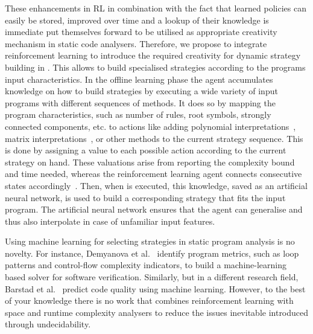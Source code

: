 \documentclass[envcountsame]{llncs}
\begin{document}
These enhancements in RL in combination with the fact that learned policies can easily be stored,
improved over time and a lookup of their knowledge is immediate put themselves forward to be
utilised as appropriate creativity mechanism in static code analysers.
%
Therefore, we propose to integrate reinforcement learning to introduce the required creativity for
dynamic strategy building in \tct{}. This allows to build specialised strategies according to the
programs input characteristics.
%
In the offline learning phase the agent accumulates knowledge on how to build strategies by
executing a wide variety of input programs with different sequences of methods. It does so by
mapping the program characteristics, such as number of rules, root symbols, strongly connected
components, etc\@. to actions like adding polynomial interpretations~\cite{hirokawa2008automated},
matrix interpretations~\cite{moser2008complexity}, or other methods to the current strategy
sequence. This is done by assigning a value to each possible action according to the current
strategy on hand. These valuations arise from reporting the complexity bound and time needed,
whereas the reinforcement learning agent connects consecutive states
accordingly~\cite{sutton1998introduction}.
%
Then, when \tct{} is executed, this knowledge, saved as an artificial neural network, is used to
build a corresponding strategy that fits the input program. The artificial neural network ensures
that the agent can generalise and thus also interpolate in case of unfamiliar input features.

%


Using machine learning for selecting strategies in static program analysis is no novelty. For
instance, Demyanova et al.~\cite{demyanova2017empirical} identify program metrics, such as loop
patterns and control-flow complexity indicators, to build a machine-learning based solver for
software verification. Similarly, but in a different research field, Barstad et
al.~\cite{barstad2014predicting} predict code quality using machine learning. However, to the best
of your knowledge there is no work that combines reinforcement learning with space and runtime
complexity analysers to reduce the issues inevitable introduced through undecidability.
\end{document}
